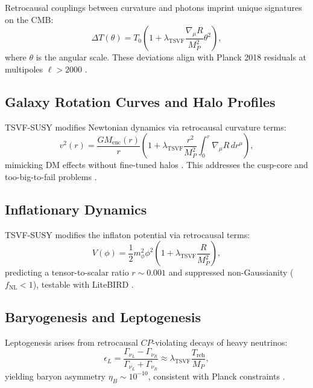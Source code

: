 \documentclass[twocolumn,superscriptaddress,floatfix]{revtex4-2}
\begin{document}
Retrocausal couplings between curvature and photons imprint unique signatures on the CMB:
\begin{equation}
\Delta T(\theta) = T_0 \left(1 + \lambda_{\text{TSVF}}\frac{\nabla_\mu R}{M_P^2}\theta^2\right),
\label{eq:cmb_anisotropy}
\end{equation}
where \(\theta\) is the angular scale. These deviations align with Planck 2018 residuals at multipoles \(\ell > 2000\) \cite{Planck2018}.

\subsection{Galaxy Rotation Curves and Halo Profiles}
\label{subsec:halos}

TSVF-SUSY modifies Newtonian dynamics via retrocausal curvature terms:
\begin{equation}
v^2(r) = \frac{G M_{\text{enc}}(r)}{r} \left(1 + \lambda_{\text{TSVF}} \frac{r^2}{M_P^2} \int_0^r \nabla_\mu R \, dr^\mu \right),
\label{eq:velocity_profile}
\end{equation}
mimicking DM effects without fine-tuned halos \cite{Milgrom1983}. This addresses the cusp-core \cite{deBlok2010} and too-big-to-fail problems \cite{Boylan-Kolchin2011}.

\subsection{Inflationary Dynamics}
\label{subsec:inflation}

TSVF-SUSY modifies the inflaton potential via retrocausal terms:
\begin{equation}
V(\phi) = \frac{1}{2}m_\phi^2\phi^2 \left(1 + \lambda_{\text{TSVF}} \frac{R}{M_P^2}\right),
\label{eq:inflation_potential}
\end{equation}
predicting a tensor-to-scalar ratio \(r \sim 0.001\) and suppressed non-Gaussianity (\(f_{\text{NL}} < 1\)), testable with LiteBIRD \cite{Hazumi2019}.

\subsection{Baryogenesis and Leptogenesis}
\label{subsec:baryogenesis}

Leptogenesis arises from retrocausal \(CP\)-violating decays of heavy neutrinos:
\begin{equation}
\epsilon_L = \frac{\Gamma_{\nu_L} - \Gamma_{\nu_R}}{\Gamma_{\nu_L} + \Gamma_{\nu_R}} \approx \lambda_{\text{TSVF}} \frac{T_{\text{reh}}}{M_P},
\label{eq:leptogenesis}
\end{equation}
yielding baryon asymmetry \(\eta_B \sim 10^{-10}\), consistent with Planck constraints \cite{Planck2018}.
\end{document}
